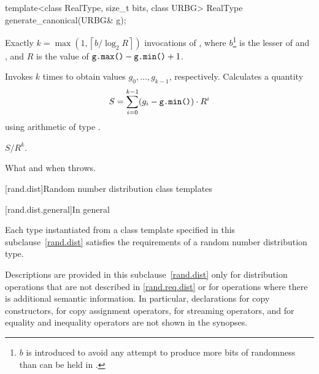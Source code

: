 %
\begin{itemdecl}
template<class RealType, size_t bits, class URBG>
 RealType generate_canonical(URBG& g);
\end{itemdecl}

\begin{itemdescr}
\pnum\complexity Exactly
 $k = \max(1, \left\lceil b / \log_2 R \right\rceil)$
 invocations
 of ,
 where $b$\footnote{$b$ is introduced
   to avoid any attempt
   to produce more bits of randomness
   than can be held in .}
   is the lesser of 
                and ,
 and
   $R$ is the value of $\texttt{g.max()} - \texttt{g.min()} + 1$.

\pnum\effects
 Invokes  $k$ times
 to obtain values $g_0, \dotsc, g_{k-1}$, respectively.
 Calculates a quantity
 \[
   S = \sum_{i=0}^{k-1} (g_i - \texttt{g.min()})
                        \cdot R^i
 \]
 using arithmetic of type
 .

\pnum
\returns $S / R^k$.

\pnum\throws What and when  throws.
\end{itemdescr}%




[rand.dist]{Random number distribution class templates}%

[rand.dist.general]{In general}

\pnum
Each type instantiated
from a class template specified in this subclause~\ref{rand.dist}
satisfies the requirements
of a random number distribution type.

\pnum
Descriptions are provided in this subclause~\ref{rand.dist}
only for distribution operations
that are not described in \ref{rand.req.dist}
or for operations where there is additional semantic information.
In particular,
declarations for copy constructors,
for copy assignment operators,
for streaming operators,
and for equality and inequality operators
are not shown in the synopses.


